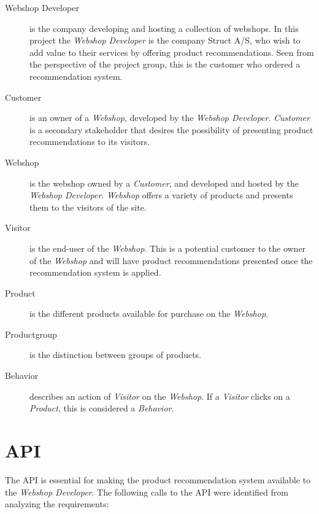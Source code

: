 \begin{description}
	\item[Webshop Developer] is the company developing and hosting a collection of webshops. In this project the \textit{Webshop Developer} is the company Struct A/S, who wish to add value to their services by offering product recommendations. Seen from the perspective of the project group, this is the customer who ordered a recommendation system.
	\item[Customer] is an owner of a \textit{Webshop}, developed by the \textit{Webshop Developer}. \textit{Customer} is a secondary stakeholder that desires the possibility of presenting product recommendations to its visitors.
	\item[Webshop] is the webshop owned by a \textit{Customer}, and developed and hosted by the \textit{Webshop Developer}. \textit{Webshop} offers a variety of products and presents them to the visitors of the site.
	\item[Visitor] is the end-user of the \textit{Webshop}. This is a potential customer to the owner of the \textit{Webshop} and will have product recommendations presented once the recommendation system is applied.
	\item[Product] is the different products available for purchase on the \textit{Webshop}. 
	\item[Productgroup] is the distinction between groups of products.
	\item[Behavior] describes an action of \textit{Visitor} on the \textit{Webshop}. If a \textit{Visitor} clicks on a \textit{Product}, this is considered a \textit{Behavior}. 
\end{description}

\section{API}
The API is essential for making the product recommendation system available to the \textit{Webshop Developer}. The following calls to the API were identified from analyzing the requirements:

